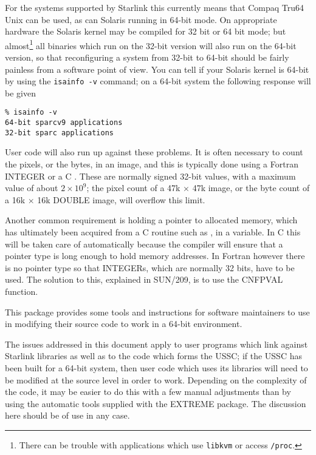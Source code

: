 \documentclass[twoside,11pt]{article}
\newcommand{\xref}[3]{#1}
\renewcommand{\_}{\texttt{\symbol{95}}}
\begin{document}
For the systems supported by
Starlink this currently means that Compaq Tru64 Unix can be used,
as can Solaris running in 64-bit mode.  
On appropriate hardware the Solaris kernel 
may be compiled for 32 bit or 64 bit mode;
but almost\footnote{
   There can be trouble with applications which use 
   {\tt libkvm} or access {\tt /proc}.}
all binaries which run on the 32-bit version
will also run on the 64-bit version, 
so that reconfiguring a system from 32-bit to 64-bit should be
fairly painless from a software point of view.
You can tell if your Solaris kernel is 64-bit 
by using the {\tt isainfo -v} command; on a 64-bit system the
following response will be given
\begin{squote}
\begin{verbatim}
% isainfo -v
64-bit sparcv9 applications
32-bit sparc applications
\end{verbatim}
\end{squote}

User code will also run up against these problems.
It is often necessary to count the pixels, or the bytes,
in an image, and this is typically done using a Fortran INTEGER
or a C .  These are normally signed 32-bit values, with
a maximum value of about $2 \times 10^9$; the pixel count of a 
47k $\times$ 47k image, or the byte count of a 16k $\times$ 16k 
\_DOUBLE image, will overflow this limit.

Another common requirement is holding a pointer 
to allocated memory, which has ultimately been 
acquired from a C routine such as , 
in a variable.
In C this will be taken care of automatically because the compiler
will ensure that a pointer type is long enough to hold memory addresses.
In Fortran however there is no pointer type so that INTEGERs, which are
normally 32 bits, have to be used.
The solution to this, explained in \xref{SUN/209}{sun209}{pointers},
is to use the \xref{CNF\_PVAL}{sun209}{CNF\_PVAL} function.

This package provides some tools and instructions for 
software maintainers to use 
in modifying their source code to work in a 64-bit environment.

The issues addressed in this document apply to user programs which link
against Starlink libraries as well as to the code which forms the USSC;
if the USSC has been built for a 64-bit system, then user code 
which uses its libraries will need to be modified at the 
source level in order to work.
Depending on the complexity of the code, it may be easier to do this
with a few manual adjustments than by using the automatic 
tools supplied with the EXTREME package.  
The discussion here should be of use in any case.
\end{document}
